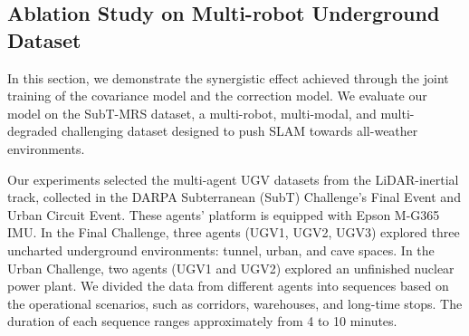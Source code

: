 \subsection{Ablation Study on Multi-robot Underground Dataset}\label{Exp: Subt}

In this section, we demonstrate the synergistic effect achieved through the joint training of the covariance model and the correction model.
We evaluate our model on the SubT-MRS dataset\cite{zhao2023subt}, a multi-robot, multi-modal, and multi-degraded challenging dataset designed to push SLAM towards all-weather environments.

Our experiments selected the multi-agent UGV datasets from the LiDAR-inertial track, collected in the DARPA Subterranean (SubT) Challenge's Final Event and Urban Circuit Event. These agents' platform is equipped with Epson M-G365 IMU. 
In the Final Challenge, three agents (UGV1, UGV2, UGV3) explored three uncharted underground environments: tunnel, urban, and cave spaces. 
In the Urban Challenge, two agents (UGV1 and UGV2) explored an unfinished nuclear power plant. 
We divided the data from different agents into sequences based on the operational scenarios, such as corridors, warehouses, and long-time stops. The duration of each sequence ranges approximately from 4 to 10 minutes.

